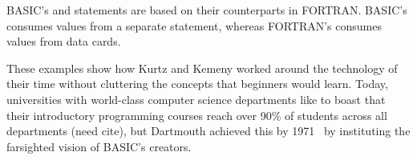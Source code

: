   \begin{geeknote}
  BASIC's  and  statements are based on their
  counterparts in FORTRAN.  BASIC's  consumes values from a
  separate  statement, whereas FORTRAN's  consumes
  values from data cards.
  \end{geeknote}

These examples show how Kurtz and Kemeny worked around the technology of their
time without cluttering the concepts that beginners would learn.
Today, universities with world-class computer science
departments like to boast that their introductory programming courses
reach over 90\% of
students across all departments (need cite), but
Dartmouth achieved this by 1971~\cite{man_and_computer} by instituting the farsighted 
vision of BASIC's creators.



